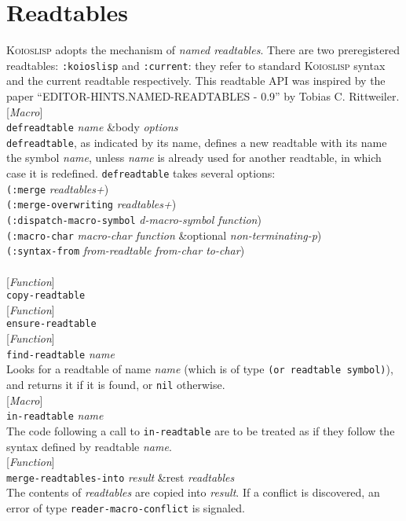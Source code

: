 \documentclass[10pt]{book}
\newenvironment{defother}[2]{[\textit{#1}]\\\texttt{#2}}{\\}
\newenvironment{defun}[1]{\begin{defother}{Function}{#1}}{\end{defother}}
\newenvironment{defmacro}[1]{\begin{defother}{Macro}{#1}}{\end{defother}}
\begin{document}
\section{Readtables}
\textsc{Koioslisp} adopts the mechanism of \textit{named readtables}. There are two preregistered readtables: \texttt{:koioslisp} and \texttt{:current}: they refer to standard \textsc{Koioslisp} syntax and the current readtable respectively. This readtable API was inspired by the paper ``EDITOR-HINTS.NAMED-READTABLES - 0.9'' by Tobias C. Rittweiler.
\begin{defmacro}{defreadtable} \textit{name} \&body \textit{options}\\
\texttt{defreadtable}, as indicated by its name, defines a new readtable with its name the symbol \textit{name}, unless \textit{name} is already used for another readtable, in which case it is redefined. \texttt{defreadtable} takes several options:\\
\texttt{(:merge} \textit{readtables+})\\
\texttt{(:merge-overwriting} \textit{readtables+})\\
\texttt{(:dispatch-macro-symbol} \textit{d-macro-symbol function})\\
\texttt{(:macro-char} \textit{macro-char function} \&optional \textit{non-terminating-p})\\\hline
\texttt{(:syntax-from} \textit{from-readtable from-char to-char})\\\hline
\end{defmacro}
\begin{defun}{copy-readtable}\end{defun}
\begin{defun}{ensure-readtable}\end{defun}
\begin{defun}{find-readtable} \textit{name}\\
Looks for a readtable of name \textit{name} (which is of type \texttt{(or readtable symbol)}), and returns it if it is found, or \texttt{nil} otherwise.
\end{defun}
\begin{defmacro}{in-readtable} \textit{name}\\
The code following a call to \texttt{in-readtable} are to be treated as if they follow the syntax defined by readtable \textit{name}.
\end{defmacro}
\begin{defun}{merge-readtables-into} \textit{result} \&rest \textit{readtables} \\
The contents of \textit{readtables} are copied into \textit{result}. If a conflict is discovered, an error of type \texttt{reader-macro-conflict} is signaled.
\end{defun}
\end{document}
